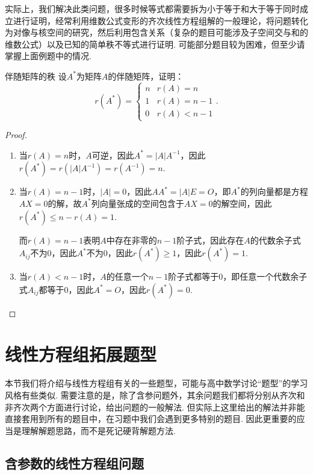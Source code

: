 实际上，我们解决此类问题，很多时候等式都需要拆为小于等于和大于等于同时成立进行证明，经常利用维数公式变形的齐次线性方程组解的一般理论，将问题转化为对像与核空间的研究，然后利用包含关系（复杂的题目可能涉及子空间交与和的维数公式）以及已知的简单秩不等式进行证明. 可能部分题目较为困难，但至少请掌握上面例题中的情况.
\begin{example}{}{伴随矩阵的秩}
    设$A^*$为矩阵$A$的伴随矩阵，证明：
    \[r(A^*)=\begin{cases}
            n & r(A)=n \\ 1 & r(A)=n-1 \\ 0 & r(A) < n-1
        \end{cases}.\]
\end{example}

\begin{proof}
    \begin{enumerate}
        \item 当$r(A)=n$时，$A$可逆，因此$A^*=|A|A^{-1}$，因此$r(A^*)=r(|A|A^{-1})=r(A^{-1})=n$.

        \item 当$r(A)=n-1$时，$|A|=0$，因此$AA^*=|A|E=O$，即$A^*$的列向量都是方程$AX=0$的解，故$A^*$列向量张成的空间包含于$AX=0$的解空间，因此$r(A^*)\leqslant n-r(A)=1$.

              而$r(A)=n-1$表明$A$中存在非零的$n-1$阶子式，因此存在$A$的代数余子式$A_{ij}$不为0，因此$A^*$不为0，因此$r(A^*)\geqslant 1$，因此$r(A^*)=1$.

        \item 当$r(A)<n-1$时，$A$的任意一个$n-1$阶子式都等于0，即任意一个代数余子式$A_{ij}$都等于0，因此$A^*=O$，因此$r(A^*)=0$.
    \end{enumerate}
\end{proof}

\section{线性方程组拓展题型}

本节我们将介绍与线性方程组有关的一些题型，可能与高中数学讨论``题型''的学习风格有些类似. 需要注意的是，除了含参问题外，其余问题我们都将分别从齐次和非齐次两个方面进行讨论，给出问题的一般解法. 但实际上这里给出的解法并非能直接套用到所有的题目中，在习题中我们会遇到更多特别的题目. 因此更重要的应当是理解解题思路，而不是死记硬背解题方法.

\subsection{含参数的线性方程组问题}

